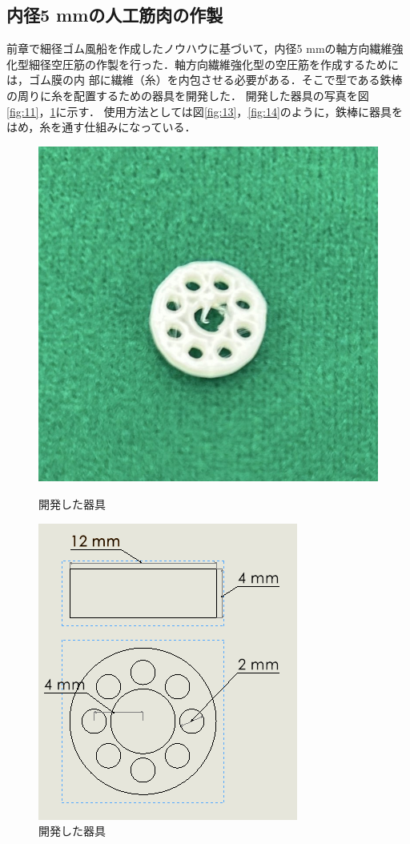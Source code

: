 \subsection{内径5 mmの人工筋肉の作製}
前章で細径ゴム風船を作成したノウハウに基づいて，内径5 mmの軸方向繊維強化型細径空圧筋の作製を行った．軸方向繊維強化型の空圧筋を作成するためには，ゴム膜の内
部に繊維（糸）を内包させる必要がある．そこで型である鉄棒の周りに糸を配置するための器具を開発した．
開発した器具の写真を図\ref{fig:11}，\ref{fig:12}に示す．
使用方法としては図\ref{fig:13}，\ref{fig:14}のように，鉄棒に器具をはめ，糸を通す仕組みになっている．
\begin{figure}[h]
  \centering
  \begin{minipage}{0.49\hsize}
      \centering
      \includegraphics[scale=0.25]{pic/kigu2.jpg}
      \caption{開発した器具}
      \label{fig:11}
  \end{minipage} \hfill
  \begin{minipage}{0.49\hsize}
      \centering
      \includegraphics[scale=0.5]{pic/5mm.PNG}
      \caption{開発した器具}
      \label{fig:12}
  \end{minipage} 
\end{figure}

